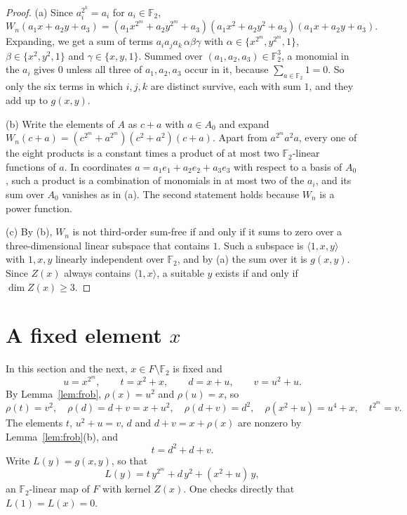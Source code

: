 \documentclass[11pt]{amsart}
\theoremstyle{definition}
\theoremstyle{remark}
\numberwithin{equation}{section}
\newcommand{\F}{\mathbb{F}}
\begin{document}
\begin{proof}
(a) Since $a_i^{2^k}=a_i$ for $a_i\in\F_2$,
\[
W_n(a_1x+a_2y+a_3)=(a_1x^{2^m}+a_2y^{2^m}+a_3)(a_1x^2+a_2y^2+a_3)(a_1x+a_2y+a_3).
\]
Expanding, we get a sum of terms $a_ia_ja_k\,\alpha\beta\gamma$ with $\alpha\in\{x^{2^m},y^{2^m},1\}$, $\beta\in\{x^2,y^2,1\}$ and $\gamma\in\{x,y,1\}$. Summed over $(a_1,a_2,a_3)\in\F_2^3$, a monomial in the $a_i$ gives $0$ unless all three of $a_1,a_2,a_3$ occur in it, because $\sum_{a\in\F_2}1=0$. So only the six terms in which $i,j,k$ are distinct survive, each with sum $1$, and they add up to $g(x,y)$.

(b) Write the elements of $A$ as $c+a$ with $a\in A_0$ and expand $W_n(c+a)=(c^{2^m}+a^{2^m})(c^2+a^2)(c+a)$. Apart from $a^{2^m}a^2a$, every one of the eight products is a constant times a product of at most two $\F_2$-linear functions of $a$. In coordinates $a=a_1e_1+a_2e_2+a_3e_3$ with respect to a basis of $A_0$, such a product is a combination of monomials in at most two of the $a_i$, and its sum over $A_0$ vanishes as in (a). The second statement holds because $W_n$ is a power function.

(c) By (b), $W_n$ is not third-order sum-free if and only if it sums to zero over a three-dimensional linear subspace that contains $1$. Such a subspace is $\langle 1,x,y\rangle$ with $1,x,y$ linearly independent over $\F_2$, and by (a) the sum over it is $g(x,y)$. Since $Z(x)$ always contains $\langle1,x\rangle$, a suitable $y$ exists if and only if $\dim Z(x)\ge3$.
\end{proof}

\section{A fixed element \texorpdfstring{$x$}{x}}\label{sec:fixed}

In this section and the next, $x\in F\setminus\F_2$ is fixed and
\[
u=x^{2^m},\qquad t=x^2+x,\qquad d=x+u,\qquad v=u^2+u .
\]
By Lemma~\ref{lem:frob}, $\rho(x)=u^2$ and $\rho(u)=x$, so
\begin{equation}\label{eq:rho}
\rho(t)=v^2,\quad \rho(d)=d+v=x+u^2,\quad \rho(d+v)=d^2,\quad \rho(x^2+u)=u^4+x,\quad t^{2^m}=v .
\end{equation}
The elements $t$, $u^2+u=v$, $d$ and $d+v=x+\rho(x)$ are nonzero by Lemma~\ref{lem:frob}(b), and
\begin{equation}\label{eq:t}
t=d^2+d+v .
\end{equation}
Write $L(y)=g(x,y)$, so that
\[
L(y)=t\,y^{2^m}+d\,y^2+(x^2+u)\,y ,
\]
an $\F_2$-linear map of $F$ with kernel $Z(x)$. One checks directly that $L(1)=L(x)=0$.
\end{document}
